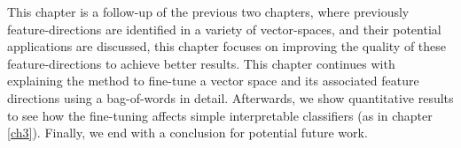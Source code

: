 



  



This chapter is a follow-up of the previous two chapters, where previously feature-directions are identified in a variety of vector-spaces, and their potential applications are discussed, this chapter focuses on improving the quality of these feature-directions to achieve better results. This chapter continues with explaining the method to fine-tune a vector space and its associated feature directions using a bag-of-words in detail. Afterwards, we show  quantitative results to see how the fine-tuning affects simple interpretable classifiers (as in chapter \ref{ch3}). Finally, we end with a conclusion for potential future work.





